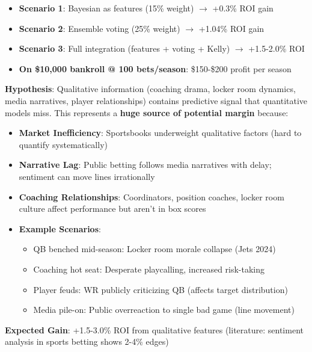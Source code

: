 \begin{itemize}
  \item \textbf{Scenario 1}: Bayesian as features (15\% weight) $\to$ +0.3\% ROI gain
  \item \textbf{Scenario 2}: Ensemble voting (25\% weight) $\to$ +1.04\% ROI gain
  \item \textbf{Scenario 3}: Full integration (features + voting + Kelly) $\to$ +1.5-2.0\% ROI
  \item \textbf{On \$10,000 bankroll @ 100 bets/season}: \$150-\$200 profit per season
\end{itemize}


\textbf{Hypothesis}: Qualitative information (coaching drama, locker room dynamics, media narratives, player relationships) contains predictive signal that quantitative models miss. This represents a \textbf{huge source of potential margin} because:
\begin{itemize}
  \item \textbf{Market Inefficiency}: Sportsbooks underweight qualitative factors (hard to quantify systematically)
  \item \textbf{Narrative Lag}: Public betting follows media narratives with delay; sentiment can move lines irrationally
  \item \textbf{Coaching Relationships}: Coordinators, position coaches, locker room culture affect performance but aren't in box scores
  \item \textbf{Example Scenarios}:
  \begin{itemize}
    \item QB benched mid-season: Locker room morale collapse (Jets 2024)
    \item Coaching hot seat: Desperate playcalling, increased risk-taking
    \item Player feuds: WR publicly criticizing QB (affects target distribution)
    \item Media pile-on: Public overreaction to single bad game (line movement)
  \end{itemize}
\end{itemize}

\textbf{Expected Gain}: +1.5-3.0\% ROI from qualitative features (literature: sentiment analysis in sports betting shows 2-4\% edges)


